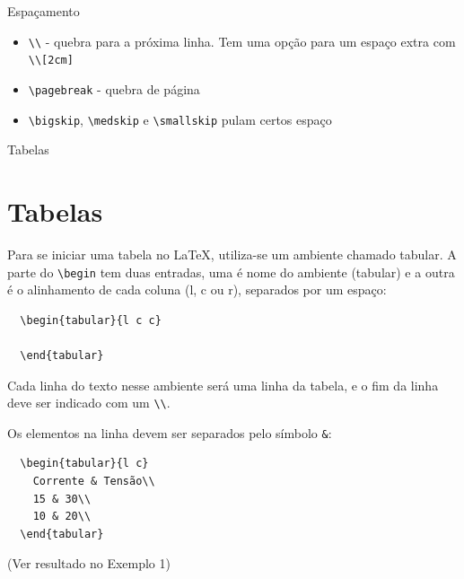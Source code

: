 \documentclass[12pt]{beamer}
\begin{document}
\begin{frame}[fragile]{Espaçamento}

\begin{itemize}
  \item \verb+\\+ - quebra para a próxima linha. Tem uma opção para um espaço extra com \verb+\\[2cm]+
  \item \verb+\pagebreak+ - quebra de página
  \item \verb+\bigskip+, \verb+\medskip+ e \verb+\smallskip+ pulam certos espaço
\end{itemize}

\end{frame}

\begin{frame}[fragile]{Tabelas}
  \section{Tabelas}
  Para se iniciar uma tabela no \LaTeX, utiliza-se um ambiente chamado tabular. A parte do \verb+\begin+ tem duas entradas, uma é nome do ambiente (tabular) e a outra é o alinhamento de cada coluna (l, c ou r), separados por um espaço:
  \begin{verbatim}
  \begin{tabular}{l c c}

  \end{tabular}
  \end{verbatim}
\end{frame}

\begin{frame}[fragile]
  Cada linha do texto nesse ambiente será uma linha da tabela, e o fim da linha deve ser indicado com um \verb+\\+.

  Os elementos na linha devem ser separados pelo símbolo \verb+&+:
  \begin{verbatim}
  \begin{tabular}{l c}
    Corrente & Tensão\\
    15 & 30\\
    10 & 20\\
  \end{tabular}
  \end{verbatim}

  (Ver resultado no Exemplo 1)
\end{frame}
\end{document}

